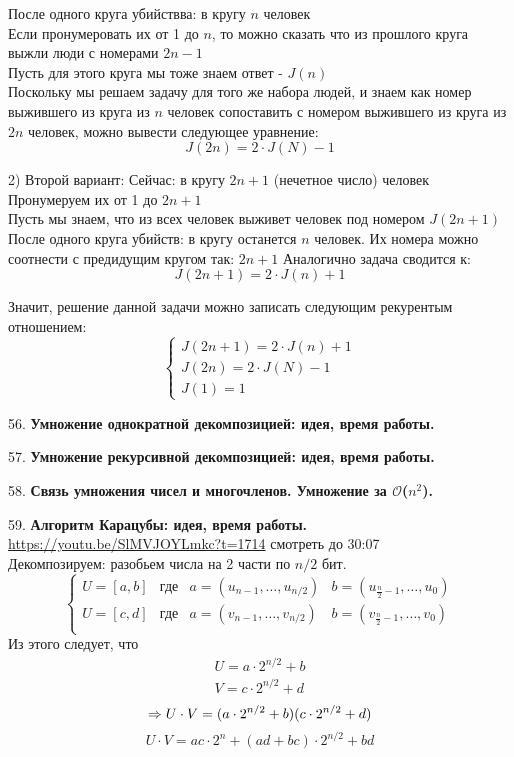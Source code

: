 \documentclass[12pt]{article}
\begin{document}
После одного круга убийствва: в кругу $n$ человек \\
Если пронумеровать их от 1 до $n$, то можно сказать что из прошлого круга выжли люди с номерами $2n - 1$\\
Пусть для этого круга мы тоже знаем ответ - $J(n)$ \\
Поскольку мы решаем задачу для того же набора людей, и знаем как номер выжившего из круга из $n$ человек сопоставить с номером выжившего 
из круга из $2n$ человек, можно вывести следующее уравнение:
$$J(2n)=2\cdot J(N) - 1$$

2) Второй вариант:
Сейчас: в кругу $2n+1$ (нечетное число) человек \\
Пронумеруем их от 1 до $2n+1$ \\
Пусть мы знаем, что из всех человек выживет человек под номером $J(2n+1)$ \\

После одного круга убийств: в кругу останется $n$ человек.
Их номера можно соотнести с предидущим кругом так: $2n+1$
Аналогично задача сводится к:
$$J(2n+1) = 2\cdot J(n) + 1$$

Значит, решение данной задачи можно записать следующим рекурентым отношением:\\
\[
\begin{cases}
J(2n+1) = 2\cdot J(n) + 1
\\
J(2n)=2\cdot J(N) - 1
\\
J(1) = 1
\end{cases}
\]

56. \textbf{Умножение однократной декомпозицией: идея, время работы.}

57. \textbf{Умножение рекурсивной декомпозицией: идея, время работы.}

58. \textbf{Связь умножения чисел и многочленов. Умножение за $\mathcal{O}$($n^2$).}

59. \textbf{Алгоритм Карацубы: идея, время работы.}\\
\url{https://youtu.be/SlMVJOYLmkc?t=1714}
смотреть до 30:07\\
Декомпозируем: разобьем числа на 2 части по $n/2$ бит.
\[
  \left\{
  \begin{array}{lccc}
    U = [a, b] & \text{где} & a = (u_{n-1}, \dots, u_{n/2}) & b = (u_{\frac{n}{2}-1}, \dots, u_0)\\
    U = [c, d] & \text{где} & a = (v_{n-1}, \dots, v_{n/2}) & b = (v_{\frac{n}{2}-1}, \dots, v_0)\\
  \end{array}
  \right.
\] 
Из этого следует, что 
\[
  \begin{array}{l}
    U = a \cdot 2^{n/2} + b\\
    V = c \cdot 2^{n/2} + d
  \end{array}
\]
\[
\Rightarrow
    U \cdot V = (a \cdot 2^{n/2} + b)(c\cdot 2^{n / 2} + d)\\
\]
\[
    U \cdot V = ac \cdot 2^n + (ad + bc) \cdot 2^{n/2} + bd
\]
\end{document}
